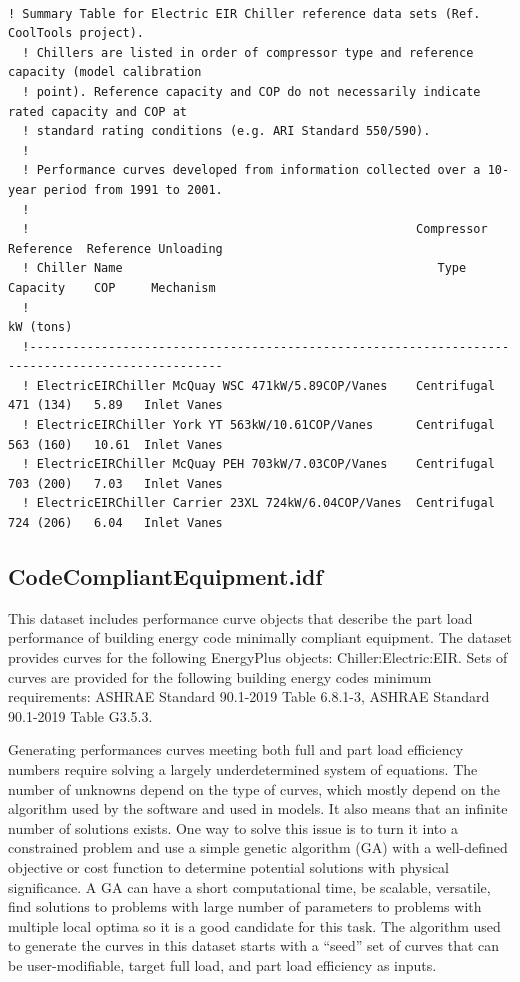 \begin{lstlisting}

! Summary Table for Electric EIR Chiller reference data sets (Ref. CoolTools project).
  ! Chillers are listed in order of compressor type and reference capacity (model calibration
  ! point). Reference capacity and COP do not necessarily indicate rated capacity and COP at
  ! standard rating conditions (e.g. ARI Standard 550/590).
  !
  ! Performance curves developed from information collected over a 10-year period from 1991 to 2001.
  !
  !                                                      Compressor   Reference  Reference Unloading
  ! Chiller Name                                            Type       Capacity    COP     Mechanism
  !                                                                    kW (tons)
  !-------------------------------------------------------------------------------------------------
  ! ElectricEIRChiller McQuay WSC 471kW/5.89COP/Vanes    Centrifugal   471 (134)   5.89   Inlet Vanes
  ! ElectricEIRChiller York YT 563kW/10.61COP/Vanes      Centrifugal   563 (160)   10.61  Inlet Vanes
  ! ElectricEIRChiller McQuay PEH 703kW/7.03COP/Vanes    Centrifugal   703 (200)   7.03   Inlet Vanes
  ! ElectricEIRChiller Carrier 23XL 724kW/6.04COP/Vanes  Centrifugal   724 (206)   6.04   Inlet Vanes
\end{lstlisting}

\subsection{CodeCompliantEquipment.idf}\label{codecompliantequipment.idf}

This dataset includes performance curve objects that describe the part load performance of building energy code minimally compliant equipment. The dataset provides curves for the following EnergyPlus objects: Chiller:Electric:EIR. Sets of curves are provided for the following building energy codes minimum requirements: ASHRAE Standard 90.1-2019 Table 6.8.1-3, ASHRAE Standard 90.1-2019 Table G3.5.3.

Generating performances curves meeting both full and part load efficiency numbers require solving a largely underdetermined system of equations. The number of unknowns depend on the type of curves, which mostly depend on the algorithm used by the software and used in models. It also means that an infinite number of solutions exists. One way to solve this issue is to turn it into a constrained problem and use a simple genetic algorithm (GA) with a well-defined objective or cost function to determine potential solutions with physical significance. A GA can have a short computational time, be scalable, versatile, find solutions to problems with large number of parameters to problems with multiple local optima so it is a good candidate for this task. The algorithm used to generate the curves in this dataset starts with a ``seed'' set of curves that can be user-modifiable, target full load, and part load efficiency as inputs.

